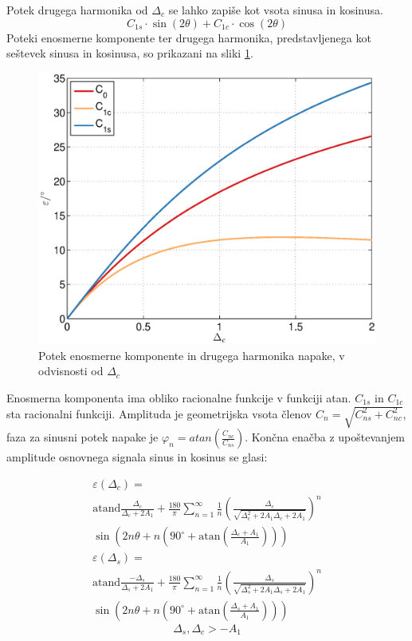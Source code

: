 \documentclass[a4paper]{article}
\begin{document}
Potek drugega harmonika od $\Delta_c$ se lahko zapiše kot vsota sinusa in kosinusa.
\begin{equation}
C_{1s} \cdot\sin(2\theta)+C_{1c} \cdot\cos(2\theta)
\end{equation}
Poteki enosmerne komponente ter drugega harmonika, predstavljenega kot seštevek sinusa in kosinusa, so prikazani na sliki \ref{fig:dc}.
\begin{figure}[!htb]
	\begin{center}
		\includegraphics[width=\linewidth]{./Slike/dc.eps}
		\caption{Potek enosmerne komponente in drugega harmonika napake, v odvisnosti od $\Delta_{c}$} \label{fig:dc}
	\end{center}
\end{figure}

Enosmerna komponenta ima obliko racionalne funkcije v funkciji atan.
$C_{1s}$ in $C_{1c}$ sta racionalni funkciji. Amplituda je geometrijska vsota členov $C_n = \sqrt{C_{ns}^2+C_{nc}^2}$, faza za sinusni potek napake je $\varphi_{n} = atan(\frac{C_{nc}}{C_{ns}})$. Končna enačba z upoštevanjem amplitude osnovnega signala sinus in kosinus se glasi:

\begin{multline}
\label{equ:dc_err}
\varepsilon(\Delta_c) =\\ \mathrm{atand}\frac{\Delta_c}{\Delta_c+2 A_1}+\frac{180}{\pi} \sum_{n=1}^{\infty}\frac{1}{n} (\frac{\Delta_c}{\sqrt{\Delta_c^2+2 A_1 \Delta_c+2 A_1}})^n\\ \sin (2n \theta+n (90^\circ+ \mathrm{ atan}(\frac{\Delta_c+A_1}{A_1})))
\end{multline}
\begin{multline}
\label{equ:ds_err}
\varepsilon(\Delta_s) =\\ \mathrm{atand}\frac{-\Delta_s}{\Delta_s+2 A_1}+\frac{180}{\pi} \sum_{n=1}^{\infty}\frac{1}{n} (\frac{\Delta_s}{\sqrt{\Delta_s^2+2 A_1 \Delta_s+2A_1}})^n\\ \sin (2n \theta+n (90^\circ+ \mathrm{ atan}(\frac{\Delta_s+A_1}{A_1})))
\end{multline}
\begin{equation*}
\Delta_s, \Delta_c > -A_1
\end{equation*}
\end{document}

